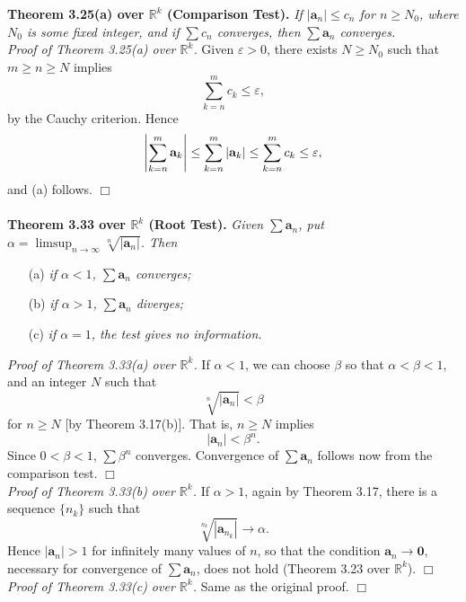 \documentclass{article}
\begin{document}
\textbf{Theorem 3.25(a) over $\mathbb{R}^k$ (Comparison Test).}
\emph{If $|\mathbf{a}_n| \leq c_n$ for $n \geq N_0$, where $N_0$ is some fixed integer,
and if $\sum c_n$ converges, then $\sum \mathbf{a}_n$ converges.} \\

\emph{Proof of Theorem 3.25(a) over $\mathbb{R}^k$.}
Given $\varepsilon > 0$, there exists $N \geq N_0$ such that $m \geq n \geq N$ implies
\[
  \sum_{k=n}^{m} c_k \leq \varepsilon,
\]
by the Cauchy criterion. Hence
\[
  \abs{ \sum_{k=n}^{m} \mathbf{a}_k }
  \leq \sum_{k=n}^{m} |\mathbf{a}_k|
  \leq \sum_{k=n}^{m} c_k
  \leq \varepsilon,
\]
and (a) follows.
$\Box$ \\\\



\textbf{Theorem 3.33 over $\mathbb{R}^k$ (Root Test).}
\emph{Given $\sum \mathbf{a}_n$,
put $\alpha = \limsup_{n \to \infty} \sqrt[n]{|\mathbf{a}_n|}$.
Then}
\begin{enumerate}
\item[(a)]
\emph{if $\alpha < 1$, $\sum \mathbf{a}_n$ converges;}
\item[(b)]
\emph{if $\alpha > 1$, $\sum \mathbf{a}_n$ diverges;}
\item[(c)]
\emph{if $\alpha = 1$, the test gives no information.} \\
\end{enumerate}

\emph{Proof of Theorem 3.33(a) over $\mathbb{R}^k$.}
If $\alpha < 1$, we can choose $\beta$ so that $\alpha < \beta < 1$,
and an integer $N$ such that
\[
  \sqrt[n]{|\mathbf{a}_n|} < \beta
\]
for $n \geq N$ [by Theorem 3.17(b)].
That is, $n \geq N$ implies
\[
  |\mathbf{a}_n| < \beta^n.
\]
Since $0 < \beta < 1$, $\sum \beta^n$ converges.
Convergence of $\sum \mathbf{a}_n$ follows now from the comparison test.
$\Box$ \\

\emph{Proof of Theorem 3.33(b) over $\mathbb{R}^k$.}
If $\alpha > 1$, again by Theorem 3.17, there is a sequence $\{ n_k \}$ such that
\[
  \sqrt[n_k]{|\mathbf{a}_{n_k}|} \to \alpha.
\]
Hence $|\mathbf{a}_{n}| > 1$ for infinitely many values of $n$,
so that the condition $\mathbf{a}_{n} \to \mathbf{0}$,
necessary for convergence of $\sum \mathbf{a}_n$,
does not hold (Theorem 3.23 over $\mathbb{R}^k$).
$\Box$ \\

\emph{Proof of Theorem 3.33(c) over $\mathbb{R}^k$.}
Same as the original proof.
$\Box$ \\\\
\end{document}
